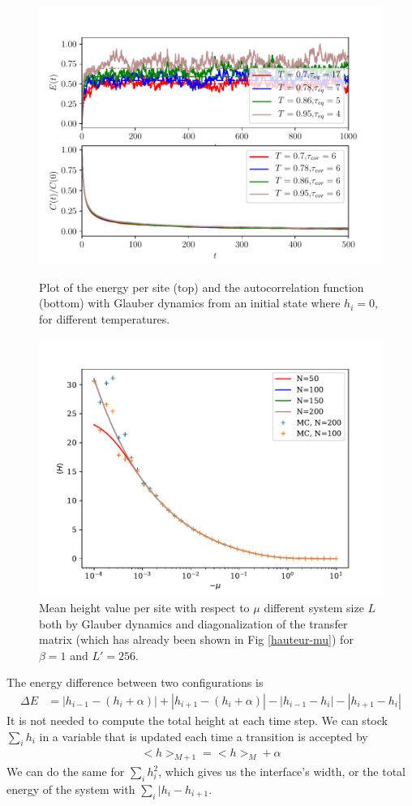 \begin{figure}
\centering
\includegraphics[scale=1]{numerical/sos-glau-eq-cor.pdf}
\caption{Plot of the energy per site (top) and the autocorrelation function (bottom) with Glauber dynamics from an initial state where $h_i=0$, for different temperatures.}
\label{eq-glau}
\includegraphics[scale=0.5]{numerical/comp-mc-tm-mu.pdf}
\caption{Mean height value per site with respect to $\mu$ different system size $L$ both by Glauber dynamics and diagonalization of the transfer matrix (which has already been shown in Fig \ref{hauteur-mu}) for $\beta=1$ and $L' = 256$.}
\label{tm-mc-equalt} 
\end{figure}
The energy difference between two configurations is
\begin{align}
	\Delta E &= |h_{i-1}-(h_i + \alpha)| + |h_{i+1}-(h_i + \alpha)| - |h_{i-1}-h_i| - |h_{i+1}-h_i|  
\end{align}
It is not needed to compute the total height at each time step. We can stock $\sum_i h_i$ in a variable that is updated each time a transition is accepted by
\begin{align}
    <h>_{M+1} = <h>_M + \alpha
\end{align}
We can do the same for $\sum_i h_i^2$, which gives us the interface's width, or the total energy of the system with $\sum_i |h_i - h_{i+1}$.

